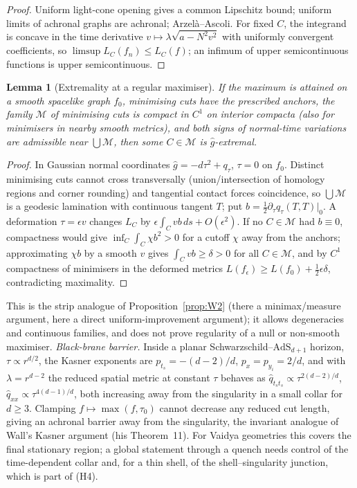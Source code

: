 \documentclass[aps,prd,onecolumn,superscriptaddress,nofootinbib,amsmath,amssymb,11pt]{revtex4-2}
\newtheorem{lemma}[theorem]{Lemma}
\theoremstyle{definition}
\begin{document}
\begin{proof}
Uniform light-cone opening gives a common Lipschitz bound; uniform limits of achronal graphs are achronal; Arzel\`a--Ascoli. For fixed
$C$, the integrand is concave in the time derivative $v\mapsto\lambda\sqrt{a-N^2v^2}$ with uniformly convergent coefficients, so
$\limsup L_C(f_n)\le L_C(f)$; an infimum of upper semicontinuous functions is upper semicontinuous.
\end{proof}

\begin{lemma}[Extremality at a regular maximiser]\label{lem:regmax}
If the maximum is attained on a smooth spacelike graph $f_0$, minimising cuts have the prescribed anchors, the family $\mathcal M$ of
minimising cuts is compact in $C^1$ on interior compacta (also for minimisers in nearby smooth metrics), and both signs of normal-time
variations are admissible near $\bigcup\mathcal M$, then some $C\in\mathcal M$ is $\widehat g$-extremal.
\end{lemma}

\begin{proof}
In Gaussian normal coordinates $\widehat g=-d\tau^2+q_\tau$, $\tau=0$ on $f_0$. Distinct minimising cuts cannot cross transversally
(union/intersection of homology regions and corner rounding) and tangential contact forces coincidence, so $\bigcup\mathcal M$ is a geodesic
lamination with continuous tangent $T$; put $b=\frac12\partial_\tau q_\tau(T,T)|_0$. A deformation $\tau=\epsilon v$ changes $L_C$ by
$\epsilon\int_Cvb\,ds+O(\epsilon^2)$. If no $C\in\mathcal M$ had $b\equiv0$, compactness would give $\inf_C\int_C\chi b^2>0$ for a cutoff $\chi$ away from the
anchors; approximating $\chi b$ by a smooth $v$ gives $\int_Cvb\ge\delta>0$ for all $C\in\mathcal M$, and by $C^1$ compactness of minimisers in the
deformed metrics $L(f_\epsilon)\ge L(f_0)+\frac12\epsilon\delta$, contradicting maximality.
\end{proof}

This is the strip analogue of Proposition~\ref{prop:W2} (there a minimax/measure argument, here a direct uniform-improvement argument);
it allows degeneracies and continuous families, and does not prove regularity of a null or non-smooth maximiser. \emph{Black-brane
barrier.} Inside a planar Schwarzschild--$\mathrm{AdS}_{d+1}$ horizon, $\tau\propto r^{d/2}$, the Kasner exponents are
$p_{t_s}=-(d-2)/d$, $p_x=p_{y_i}=2/d$, and with $\lambda=r^{d-2}$ the reduced spatial metric at constant $\tau$ behaves as
$\widehat q_{t_st_s}\propto\tau^{2(d-2)/d}$, $\widehat q_{xx}\propto\tau^{4(d-1)/d}$, both increasing away from the singularity in a small collar
for $d\ge3$. Clamping $f\mapsto\max(f,\tau_0)$ cannot decrease any reduced cut length, giving an achronal barrier away from the
singularity, the invariant analogue of Wall's Kasner argument (his Theorem~11). For Vaidya geometries this covers the final stationary
region; a global statement through a quench needs control of the time-dependent collar and, for a thin shell, of the shell--singularity
junction, which is part of (H4).
\end{document}
